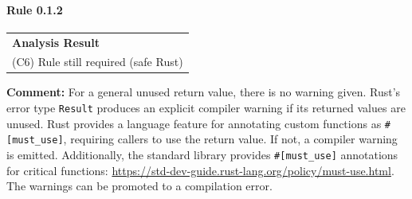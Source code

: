 \paragraph{Rule 0.1.2}
\begin{longtable}{p{13cm}}
\textbf{Analysis Result} \\
(C6) Rule still required (safe Rust) \\
\end{longtable}
\textbf{Comment:} For a general unused return value, there is no warning given. Rust's error type \texttt{Result} produces an explicit compiler warning if its returned values are unused. Rust provides a language feature for annotating custom functions as \texttt{\#[must\_use]}, requiring callers to use the return value. If not, a compiler warning is emitted. Additionally, the standard library provides \texttt{\#[must\_use]} annotations for critical functions: \url{https://std-dev-guide.rust-lang.org/policy/must-use.html}. The warnings can be promoted to a compilation error. \\


